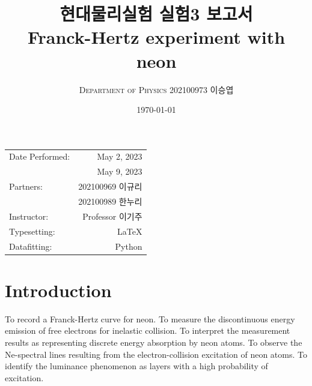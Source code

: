 \documentclass[a4paper, 10pt, nanum]{CSUniSchoolLabReport}
\title{현대물리실험 실험3 보고서 \\ Franck-Hertz experiment with neon} %
\author{\textsc{Department of Physics} 202100973 이승엽}
\date{\today}
\begin{document}
\maketitle %

\begin{center}
	\begin{tabular}{l r}
		Date Performed: & May 2, 2023 \\ %
		& May 9, 2023 \\
		Partners: & 202100969 이규리 \\ %
		& 202100989 한누리 \\
		Instructor: & Professor 이기주 \\ %
		Typesetting: & LaTeX \\
		Datafitting: & Python \\
	\end{tabular}
\end{center}


\maketitle


\section{Introduction}

  To record a Franck-Hertz curve for neon. To measure the discontinuous energy emission of free electrons for inelastic collision. To interpret the measurement results as representing discrete energy absorption by neon atoms. To observe the Ne-spectral lines resulting from the electron-collision excitation of neon atoms. To identify the luminance phenomenon as layers with a high probability of excitation. 

\end{document}
